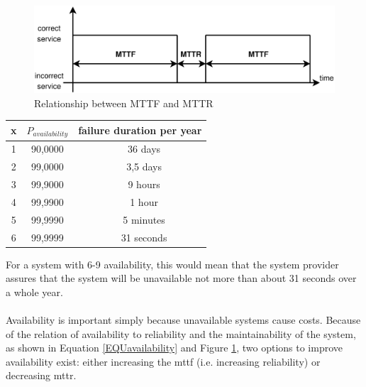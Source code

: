 \begin{figure}
    \centering
    \includegraphics[width=1\textwidth]{figures/availability.eps}
    \caption{Relationship between MTTF and MTTR}

    \label{fig:relmttfmttr}
\end{figure}
\begin{center}
\begin{tabular}{ c | c c  }
 \label{table:x-9}
  x & $P_{availability}$ & failure duration per year \\ \hline
  1 & 90,0000    & ~ 36 days \\
  2 & 99,0000    & ~ 3,5 days  \\
  3 & 99,9000    & ~ 9 hours \\
  4 & 99,9900    & ~ 1 hour \\
  5 & 99,9990    & ~ 5 minutes \\
  6 & 99,9999    & ~ 31 seconds \\ 
  
\end{tabular}
\end{center}
For a system with 6-9 availability, this would mean that the system provider assures that the system will be unavailable not more than about 31 seconds over a
whole year.
\\
\\
Availability is important simply because unavailable systems cause costs. Because of the relation of availability to reliability and the maintainability
of the system, as shown in Equation \ref{EQUavailability} and Figure \ref{fig:relmttfmttr}, two options to improve availability exist: either increasing
the \gls{mttf} (i.e. increasing reliability) or decreasing \gls{mttr}.
